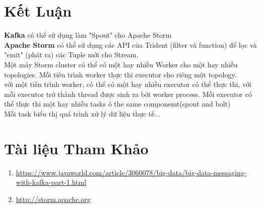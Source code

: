\documentclass{hcmutarticle}
\begin{document}
\section{Kết Luận }\label{result}
\textbf{Kafka} có thể sử dụng làm "Spout" cho Apache Storm\\
\textbf{Apache Storm} có thể sử dụng các API của Trident (filter và function) để lọc và "emit" (phát ra) các Tuple mới cho Stream.\\
Một máy Storm cluster có thể có một hay nhiều Worker cho một hay nhiều topologies.  Mỗi tiến trình worker  thực thi executor cho riêng một topology.\\
 với một tiến trình worker, có thể có một hay nhiều executor có thể thực thi, với mỗi executor trở thành thread được sinh ra bởi worker process.
Mỗi executor có thể thực thi một hay nhiều tasks ó the same componemt(spout and bolt)\\
Mỗi task biểu thị quá trình xử lý dữ liệu thực tế...
\section{Tài liệu Tham Khảo }
\begin{enumerate}
\item
\url{https://www.javaworld.com/article/3060078/big-data/big-data-messaging-with-kafka-part-1.html}
  \item \url{http://storm.apache.org}
\end{enumerate}

\end{document}
